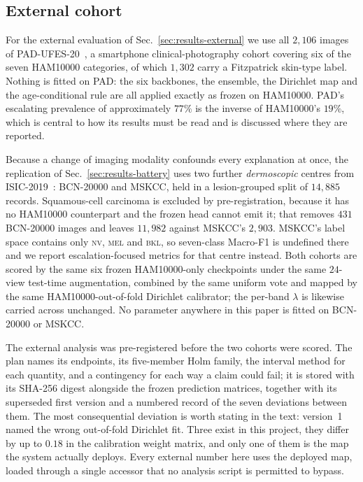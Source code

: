 \documentclass[journal]{IEEEtran}
\begin{document}
\subsection{External cohort}
\label{sec:external-data}
For the external evaluation of Sec.~\ref{sec:results-external} we use all $2{,}106$ images of
PAD-UFES-20~\cite{pacheco2020padufes}, a smartphone clinical-photography cohort covering six of
the seven HAM10000 categories, of which $1{,}302$ carry a Fitzpatrick skin-type label. Nothing
is fitted on PAD: the six backbones, the ensemble, the Dirichlet map and the age-conditional
rule are all applied exactly as frozen on HAM10000. PAD's escalating prevalence of
approximately $77\%$ is the inverse of HAM10000's $19\%$, which is central to how its results
must be read and is discussed where they are reported.

Because a change of imaging modality confounds every explanation at once, the replication of
Sec.~\ref{sec:results-battery} uses two further \emph{dermoscopic} centres from
ISIC-2019~\cite{combalia2019bcn20000, codella2018isic}: BCN-20000 and MSKCC, held in a
lesion-grouped split of $14{,}885$ records. Squamous-cell carcinoma is excluded by
pre-registration, because it has no HAM10000 counterpart and the frozen head cannot emit it;
that removes $431$ BCN-20000 images and leaves $11{,}982$ against MSKCC's $2{,}903$. MSKCC's
label space contains only \textsc{nv}, \textsc{mel} and \textsc{bkl}, so seven-class Macro-F1
is undefined there and we report escalation-focused metrics for that centre instead. Both
cohorts are scored by the same six frozen HAM10000-only checkpoints under the same $24$-view
test-time augmentation, combined by the same uniform vote and mapped by the same
HAM10000-out-of-fold Dirichlet calibrator; the per-band $\lambda$ is likewise carried across
unchanged. No parameter anywhere in this paper is fitted on BCN-20000 or MSKCC.

The external analysis was pre-registered before the two cohorts were scored. The plan names
its endpoints, its five-member Holm family, the interval method for each quantity, and a
contingency for each way a claim could fail; it is stored with its SHA-256 digest alongside
the frozen prediction matrices, together with its superseded first version and a numbered
record of the seven deviations between them. The most consequential deviation is worth
stating in the text: version~1 named the wrong out-of-fold Dirichlet fit. Three exist in this
project, they differ by up to $0.18$ in the calibration weight matrix, and only one of them is
the map the system actually deploys. Every external number here uses the deployed map, loaded
through a single accessor that no analysis script is permitted to bypass.
\end{document}
